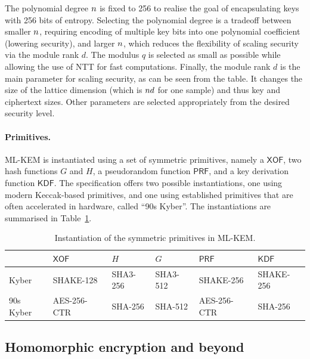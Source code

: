 The polynomial degree $n$ is fixed to 256 to realise the goal of encapsulating keys with 256 bits of entropy. Selecting the polynomial degree is a tradeoff between smaller $n$, requiring encoding of multiple key bits into one polynomial coefficient (lowering security), and larger $n$, which reduces the flexibility of scaling security via the module rank $d$. The modulus $q$ is selected as small as possible while allowing the use of NTT for fast computations. Finally, the module rank $d$ is the main parameter for scaling security, as can be seen from the table. It changes the size of the lattice dimension (which is $n d$ for one sample) and thus key and ciphertext sizes. Other parameters are selected appropriately from the desired security level.

\paragraph{Primitives.} ML-KEM is instantiated using a set of symmetric primitives, namely a $\mathsf{XOF}$, two hash functions $G$ and $H$, a pseudorandom function $\mathsf{PRF}$, and a key derivation function $\mathsf{KDF}$. The specification offers two possible instantiations, one using modern Keccak-based primitives, and one using established primitives that are often accelerated in hardware, called ``90s Kyber''. The instantiations are summarised in Table~\ref{tab:kyber-symmetric}.

\begin{table}[h]
\centering
\caption{Instantiation of the symmetric primitives in ML-KEM.}
\label{tab:kyber-symmetric}
\begin{tabular}{l l l l l l}
\toprule
 & $\mathsf{XOF}$ & $H$ & $G$ & $\mathsf{PRF}$ & $\mathsf{KDF}$ \\
\midrule
Kyber           & SHAKE-128   & SHA3-256 & SHA3-512 & SHAKE-256 & SHAKE-256 \\
90s Kyber       & AES-256-CTR & SHA-256  & SHA-512  & AES-256-CTR         & SHA-256   \\
\bottomrule
\end{tabular}
\end{table}

\subsection{Homomorphic encryption and beyond}

